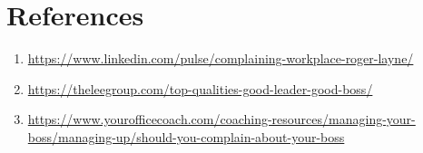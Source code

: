 \documentclass[a4paper,12pt]{report}
\begin{document}
\chapter{References}
\begin{enumerate}
  \item \url{https://www.linkedin.com/pulse/complaining-workplace-roger-layne/}
   \item \url{https://theleegroup.com/top-qualities-good-leader-good-boss/}
     \item \url{https://www.yourofficecoach.com/coaching-resources/managing-your-boss/managing-up/should-you-complain-about-your-boss}
\end{enumerate}
\end{document}

